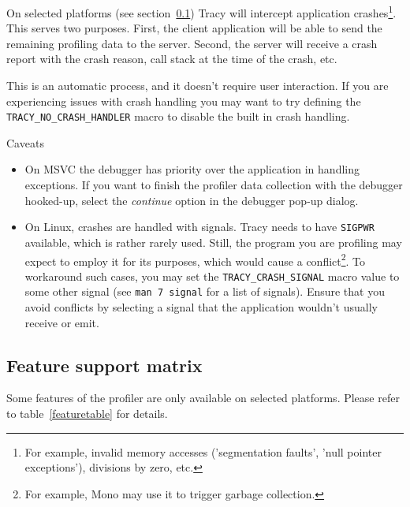 \documentclass[hidelinks,titlepage,a4paper,twoside]{article}
\begin{document}
On selected platforms (see section~\ref{featurematrix}) Tracy will intercept application crashes\footnote{For example, invalid memory accesses ('segmentation faults', 'null pointer exceptions'), divisions by zero, etc.}. This serves two purposes. First, the client application will be able to send the remaining profiling data to the server. Second, the server will receive a crash report with the crash reason, call stack at the time of the crash, etc.

This is an automatic process, and it doesn't require user interaction. If you are experiencing issues with crash handling you may want to try defining the \texttt{TRACY\_NO\_CRASH\_HANDLER} macro to disable the built in crash handling.

\begin{bclogo}[
noborder=true,
couleur=black!5,
logo=\bcattention
]{Caveats}
\begin{itemize}
\item On MSVC the debugger has priority over the application in handling exceptions. If you want to finish the profiler data collection with the debugger hooked-up, select the \emph{continue} option in the debugger pop-up dialog.
\item On Linux, crashes are handled with signals. Tracy needs to have \texttt{SIGPWR} available, which is rather rarely used. Still, the program you are profiling may expect to employ it for its purposes, which would cause a conflict\footnote{For example, Mono may use it to trigger garbage collection.}. To workaround such cases, you may set the \texttt{TRACY\_CRASH\_SIGNAL} macro value to some other signal (see \texttt{man 7 signal} for a list of signals). Ensure that you avoid conflicts by selecting a signal that the application wouldn't usually receive or emit.
\end{itemize}
\end{bclogo}

\subsection{Feature support matrix}
\label{featurematrix}

Some features of the profiler are only available on selected platforms. Please refer to table~\ref{featuretable} for details.
\end{document}
